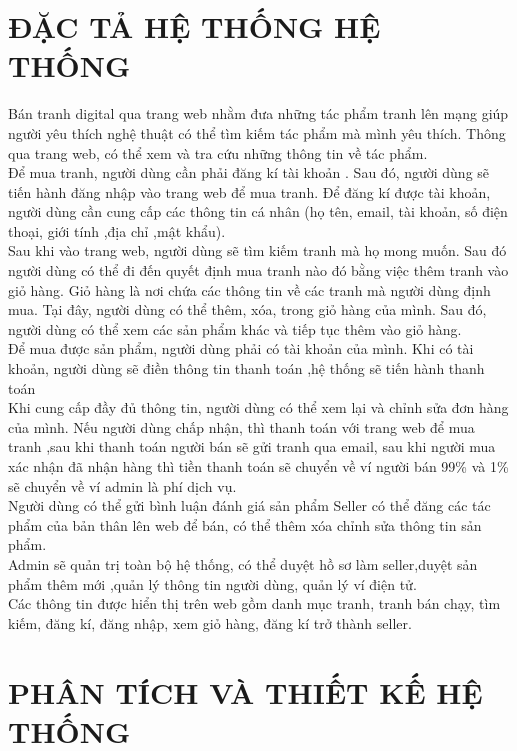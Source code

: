 \documentclass{article}
\begin{document}
\section{ĐẶC TẢ HỆ THỐNG HỆ THỐNG}
\label{sec:Đặc tả hệ thống}
{\large
Bán tranh digital qua trang web nhằm đưa những tác phẩm tranh lên mạng giúp người yêu thích nghệ thuật có thể tìm kiếm tác phẩm mà mình yêu thích. Thông qua trang web, có thể xem và tra cứu những thông tin về tác phẩm.\\
	\indent Để mua tranh, người dùng cần phải đăng kí tài khoản . Sau đó, người dùng sẽ tiến hành đăng nhập vào trang web để mua tranh. Để đăng kí được tài khoản, người dùng cần cung cấp các thông tin cá nhân (họ tên, email, tài khoản, số điện thoại, giới tính ,địa chỉ ,mật khẩu). \\
	\indent Sau khi vào trang web, người dùng sẽ tìm kiếm tranh mà họ mong muốn. Sau đó người dùng có thể đi đến quyết định mua tranh nào đó bằng việc thêm tranh vào giỏ hàng. Giỏ hàng là nơi chứa các thông tin về các tranh mà người dùng định mua. Tại đây, người dùng có thể thêm, xóa, trong giỏ hàng của mình. Sau đó, người dùng có thể xem các sản phẩm khác và tiếp tục thêm vào giỏ hàng. \\
	\indent Để mua được sản phẩm, người dùng phải có tài khoản của mình. Khi có tài khoản, người dùng sẽ điền thông tin thanh toán ,hệ thống sẽ tiến hành thanh toán\\
	\indent Khi cung cấp đầy đủ thông tin, người dùng có thể xem lại và chỉnh sửa đơn hàng của mình. Nếu người dùng chấp nhận, thì thanh toán với trang web để mua tranh ,sau khi thanh toán người bán sẽ gửi tranh qua email, sau khi người mua xác nhận đã nhận hàng thì tiền thanh toán sẽ chuyển về ví người bán 99\% và 1\% sẽ chuyển về ví admin là phí dịch vụ. \\
	\indent Người dùng có thể gửi bình luận đánh giá sản phẩm 
	\indent Seller có thể đăng các tác phẩm của bản thân lên web để bán, có thể thêm xóa chỉnh sửa thông tin sản phẩm. \\
	\indent Admin sẽ quản trị toàn bộ hệ thống, có thể duyệt hồ sơ làm seller,duyệt sản phẩm thêm mới ,quản lý thông tin người dùng, quản lý ví điện tử.\\
	\indent Các thông tin được hiển thị trên web gồm danh mục tranh, tranh  bán chạy, tìm kiếm, đăng kí, đăng nhập, xem giỏ hàng, đăng kí trở thành seller.\\
	
}

\section{PHÂN TÍCH VÀ THIẾT KẾ HỆ THỐNG}
\label{sec:phân tích và thiết kế hệ thống}
\end{document}
